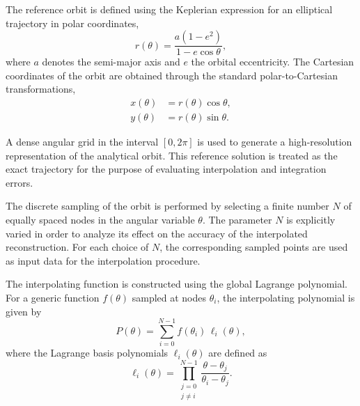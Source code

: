 \documentclass[reprint,amsmath,amssymb,aps]{revtex4-2}
\begin{document}
	The reference orbit is defined using the Keplerian expression for an elliptical trajectory in polar coordinates,
	\begin{equation}
		r(\theta)=\frac{a\left(1-e^{2}\right)}{1-e\cos\theta},
		\label{eq:kepler}
	\end{equation}
	where $a$ denotes the semi-major axis and $e$ the orbital eccentricity. The Cartesian coordinates of the orbit are obtained through the standard polar-to-Cartesian transformations,
	\begin{align}
		x(\theta) &= r(\theta)\cos\theta, \label{eq:xcoord} \\
		y(\theta) &= r(\theta)\sin\theta. \label{eq:ycoord}
	\end{align}
	
	A dense angular grid in the interval $[0,2\pi]$ is used to generate a high-resolution representation of the analytical orbit. This reference solution is treated as the exact trajectory for the purpose of evaluating interpolation and integration errors.
	
	The discrete sampling of the orbit is performed by selecting a finite number $N$ of equally spaced nodes in the angular variable $\theta$. The parameter $N$ is explicitly varied in order to analyze its effect on the accuracy of the interpolated reconstruction. For each choice of $N$, the corresponding sampled points are used as input data for the interpolation procedure.
	
	The interpolating function is constructed using the global Lagrange polynomial. For a generic function $f(\theta)$ sampled at nodes $\theta_i$, the interpolating polynomial is given by
	\begin{equation}
		P(\theta)=\sum_{i=0}^{N-1} f(\theta_i)\,\ell_i(\theta),
		\label{eq:lagrange_poly}
	\end{equation}
	where the Lagrange basis polynomials $\ell_i(\theta)$ are defined as
	\begin{equation}
		\ell_i(\theta)=\prod_{\substack{j=0 \\ j\neq i}}^{N-1}
		\frac{\theta-\theta_j}{\theta_i-\theta_j}.
		\label{eq:lagrange_basis}
	\end{equation}
	
\end{document}
